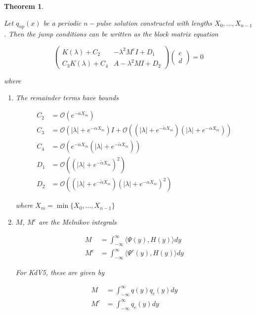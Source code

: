 \documentclass[12pt]{article}
\newtheorem{theorem}{Theorem}
\begin{document}
\begin{theorem}\label{blockmatrixform}

Let $q_{np}(x)$ be a periodic $n-$pulse solution constructed with lengths $X_0, \dots, X_{n-1}$. Then the jump conditions can be written as the block matrix equation 

\begin{equation}\label{blockeq}
\begin{pmatrix}
K(\lambda) + C_2 & -\lambda^2 M^c I + D_1 \\
C_3 K(\lambda) + C_4 & A - \lambda^2 MI + D_2
\end{pmatrix}
\begin{pmatrix}c \\ d \end{pmatrix} 
= 0
\end{equation}

where 

\begin{enumerate}

\item The remainder terms have bounds

\begin{align*}
C_2 &= \mathcal{O}(e^{-\alpha X_m}) \\
C_3 &= \mathcal{O}(|\lambda| + e^{-\alpha X_m}) I
+ \mathcal{O}((|\lambda| + e^{-\tilde{\alpha} X_m})( |\lambda| + e^{-\alpha X_m}))\\
C_4 &= \mathcal{O}(e^{-\alpha X_m}(|\lambda| + e^{-\tilde{\alpha} X_m})) \\
D_1 &= \mathcal{O}((|\lambda| + e^{-\tilde{\alpha} X_m})^2) \\
D_2 &= \mathcal{O}((|\lambda| + e^{-\tilde{\alpha} X_m})(|\lambda| + e^{-\alpha X_m})^2) 
\end{align*}

where $X_m = \min \{X_0, \dots, X_{n-1}\}$

\item $M$, $M^c$ are the Melnikov integrals

\begin{align*}
M &= \int_{-\infty}^\infty \langle \Psi(y), H(y) \rangle dy \\
M^c &= \int_{-\infty}^\infty \langle \Psi^c(y), H(y) \rangle dy
\end{align*}

For KdV5, these are given by

\begin{align*}
M &= \int_{-\infty}^\infty q(y) q_c(y) dy \\
M^c &= \int_{-\infty}^\infty q_c(y) dy
\end{align*}


\end{enumerate}
\end{theorem}
\end{document}
